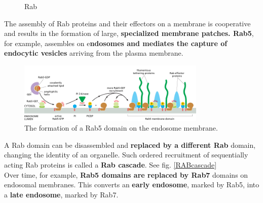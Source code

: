 \documentclass[../main.tex]{subfiles}
\begin{document}
\begin{figure}[H]
	\centering
	\caption{Rab}
\end{figure}

The assembly of Rab proteins and their effectors on a membrane is cooperative and results in the formation of large, \textbf{specialized membrane patches. Rab5}, for example, assembles on e\textbf{ndosomes and mediates the capture of endocytic vesicles} arriving from the plasma membrane.

\begin{figure}[H]
	\centering
	\includegraphics[width=0.8\textwidth]{17}
	\caption{The formation of a Rab5 domain on the endosome membrane.}
\end{figure}

A Rab domain can be disassembled and \textbf{replaced by a different Rab} domain, changing the identity of an organelle. Such ordered recruitment of sequentially acting Rab proteins is called a \textbf{Rab cascade}. See fig. \ref{RABcascade} \\
Over time, for example, \textbf{Rab5 domains are replaced by Rab7} domains on endosomal membranes. This converts an \textbf{early endosome}, marked by Rab5, into a \textbf{late endosome}, marked by Rab7.
\end{document}

